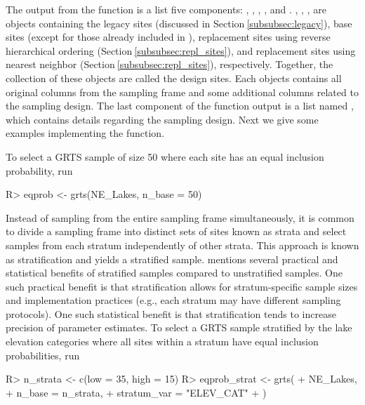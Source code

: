 \documentclass[
  shortnames]{jss}
\begin{document}
The output from the  function is a list five components:
, , ,
, and . ,
, ,  are 
objects containing the legacy sites (discussed in
Section\(~\)\ref{subsubsec:legacy}), base sites (except for those
already included in ), replacement sites using
reverse hierarchical ordering (Section\(~\)\ref{subsubsec:repl_sites}),
and replacement sites using nearest neighbor
(Section\(~\)\ref{subsubsec:repl_sites}), respectively. Together, the
collection of these  objects are called the design sites.
Each  objects contains all original columns from the
sampling frame and some additional columns related to the sampling
design. The last component of the  function output is a
list named , which contains details regarding the sampling
design. Next we give some examples implementing the 
function.

To select a GRTS sample of size 50 where each site has an equal
inclusion probability, run

\begin{CodeChunk}
\begin{CodeInput}
R> eqprob <- grts(NE_Lakes, n_base = 50)
\end{CodeInput}
\end{CodeChunk}

Instead of sampling from the entire sampling frame simultaneously, it is
common to divide a sampling frame into distinct sets of sites known as
strata and select samples from each stratum independently of other
strata. This approach is known as stratification and yields a stratified
sample. \citet{sarndal2003model} mentions several practical and
statistical benefits of stratified samples compared to unstratified
samples. One such practical benefit is that stratification allows for
stratum-specific sample sizes and implementation practices (e.g., each
stratum may have different sampling protocols). One such statistical
benefit is that stratification tends to increase precision of parameter
estimates. To select a GRTS sample stratified by the lake elevation
categories where all sites within a stratum have equal inclusion
probabilities, run

\begin{CodeChunk}
\begin{CodeInput}
R> n_strata <- c(low = 35, high = 15)
R> eqprob_strat <- grts(
+   NE_Lakes,
+   n_base = n_strata,
+   stratum_var = "ELEV_CAT"
+ )
\end{CodeInput}
\end{CodeChunk}
\end{document}
